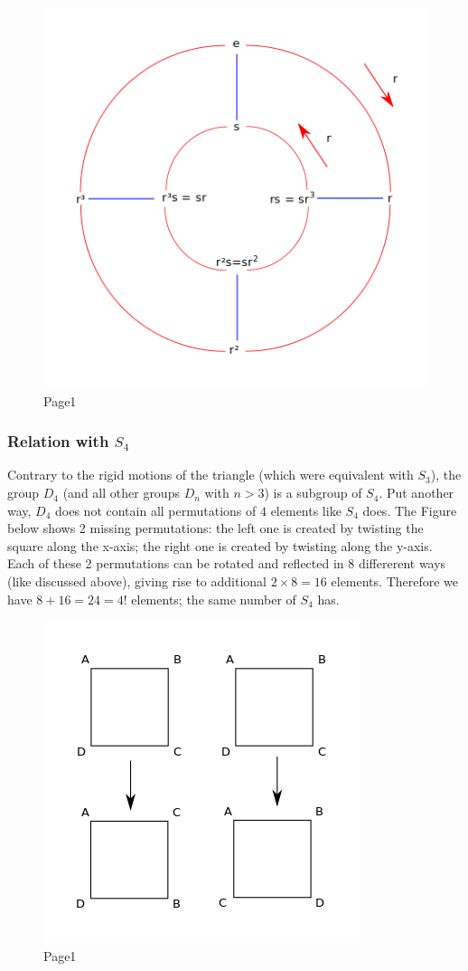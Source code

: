\begin{figure}[H]
\centering
\includegraphics[scale=0.7]{images/groups_04_5.png}
\caption{Page1}
\end{figure}

\subsubsection{\texorpdfstring{Relation with
\(S_4\)}{Relation with S\_4}}\label{relation-with-s_4}

Contrary to the rigid motions of the triangle (which were equivalent
with \(S_3\)), the group \(D_4\) (and all other groups \(D_n\) with
\(n > 3\)) is a subgroup of \(S_4\). Put another way, \(D_4\) does not
contain all permutations of \(4\) elements like \(S_4\) does. The Figure
below shows 2 missing permutations: the left one is created by twisting
the square along the x-axis; the right one is created by twisting along
the y-axis. Each of these 2 permutations can be rotated and reflected in
8 differerent ways (like discussed above), giving rise to additional
\(2 \times 8 = 16\) elements. Therefore we have \(8 + 16 = 24 = 4!\)
elements; the same number of \(S_4\) has.

\begin{figure}
\centering
\includegraphics[scale=0.7]{images/groups_04_6.png}
\caption{Page1}
\end{figure}
